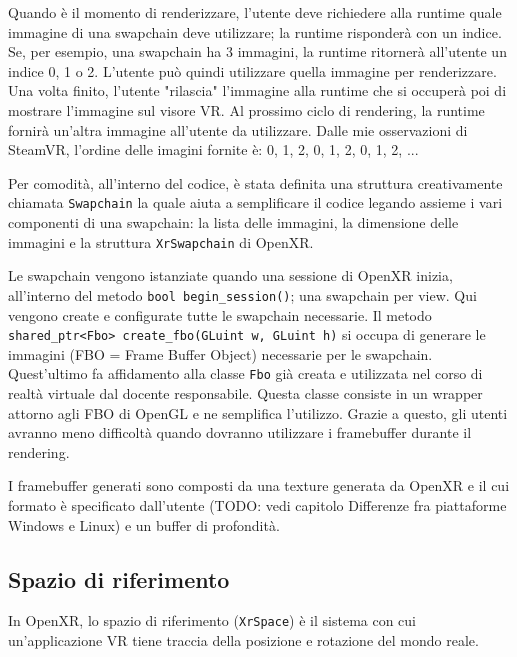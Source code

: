 \documentclass[twoside]{supsistudent}
\begin{document}
Quando è il momento di renderizzare, l'utente deve richiedere alla runtime quale immagine di una swapchain deve utilizzare; la runtime risponderà con un indice. Se, per esempio, una swapchain ha 3 immagini, la runtime ritornerà all'utente un indice 0, 1 o 2. L'utente può quindi utilizzare quella immagine per renderizzare. Una volta finito, l'utente "rilascia" l'immagine alla runtime che si occuperà poi di mostrare l'immagine sul visore VR. Al prossimo ciclo di rendering, la runtime fornirà un'altra immagine all'utente da utilizzare. Dalle mie osservazioni di SteamVR, l'ordine delle imagini fornite è: 0, 1, 2, 0, 1, 2, 0, 1, 2, ...


Per comodità, all'interno del codice, è stata definita una struttura creativamente chiamata \texttt{Swapchain} la quale aiuta a semplificare il codice legando assieme i vari componenti di una swapchain: la lista delle immagini, la dimensione delle immagini e la struttura \texttt{XrSwapchain} di OpenXR.

Le swapchain vengono istanziate quando una sessione di OpenXR inizia, all'interno del metodo \texttt{bool begin\_session()}; una swapchain per view. Qui vengono create e configurate tutte le swapchain necessarie. Il metodo \texttt{shared\_ptr<Fbo> create\_fbo(GLuint w, GLuint h)} si occupa di generare le immagini (FBO = Frame Buffer Object) necessarie per le swapchain. Quest'ultimo fa affidamento alla classe \texttt{Fbo} già creata e utilizzata nel corso di realtà virtuale dal docente responsabile. Questa classe consiste in un wrapper attorno agli FBO di OpenGL e ne semplifica l'utilizzo. Grazie a questo, gli utenti avranno meno difficoltà quando dovranno utilizzare i framebuffer durante il rendering.

I framebuffer generati sono composti da una texture generata da OpenXR e il cui formato è specificato dall'utente (TODO: vedi capitolo Differenze fra piattaforme Windows e Linux) e un buffer di profondità.

\subsection{Spazio di riferimento}

In OpenXR, lo spazio di riferimento (\texttt{XrSpace}) è il sistema con cui un'applicazione VR tiene traccia della posizione e rotazione del mondo reale.
\end{document}
